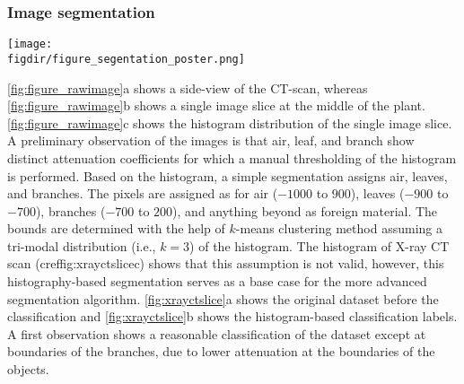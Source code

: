 \subsubsection*{Image segmentation}


\begin{sidewaysfigure}[p]
	\centering
	\texttt{[image: \\figdir/figure\_segentation\_poster.png]}
	\caption{Segmentation of the X-ray CT scan:  slice of original X-ray CT dataset,  segmentation using user-defined histogram threshold and  segmentation using Trainable WEKA Segmentation and additional morphological operation (opening + closing). Only a sub-region of an image slice is shown for clarity. The segmented pixels are labeled as air ($0$, purple), leaf ($1$, blue) and branch ($2$, yellow).}
	\label{fig:xrayctslice}
\end{sidewaysfigure}

\cref{fig:figure_rawimage}a shows a side-view of the CT-scan, whereas \cref{fig:figure_rawimage}b shows a single image slice at the middle of the plant. \cref{fig:figure_rawimage}c shows the histogram distribution of the single image slice. A preliminary observation of the images is that air, leaf, and branch show distinct attenuation coefficients for which a manual thresholding of the histogram is performed. Based on the histogram, a simple segmentation assigns air, leaves, and branches. The pixels are assigned as for air ($-1000$ to $900$), leaves ($-900$ to $-700$), branches ($-700$ to $200$), and anything beyond as foreign material. The bounds are determined with the help of $k$-means clustering method assuming a tri-modal distribution (i.e., $k=3$) of the histogram. The histogram of X-ray CT scan (cref{fig:xrayctslice}c) shows that this assumption is not valid, however, this histography-based segmentation serves as a base case for the more advanced segmentation algorithm. \cref{fig:xrayctslice}a shows the original dataset before the classification and \cref{fig:xrayctslice}b shows the histogram-based classification labels. A first observation shows a reasonable classification of the dataset except at boundaries of the branches, due to lower attenuation at the boundaries of the objects.



